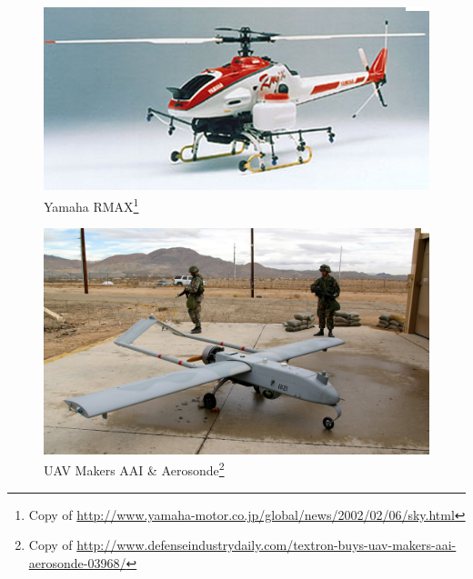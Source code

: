 \documentclass[xcolor=svgnames]{beamer}
\begin{document}
\begin{frame}
    \begin{figure}
      \includegraphics[scale=0.60]{3.png}
	\caption{Yamaha RMAX\footnote{Copy  of \url{http://www.yamaha-motor.co.jp/global/news/2002/02/06/sky.html}}}
    \end{figure}
\end{frame}

\begin{frame}
    \begin{figure}
      \includegraphics[scale=0.30]{4.png}
	\caption{UAV Makers AAI \& Aerosonde\footnote{Copy  of \url{http://www.defenseindustrydaily.com/textron-buys-uav-makers-aai-aerosonde-03968/}}}
    \end{figure}
\end{frame}
\end{document}
